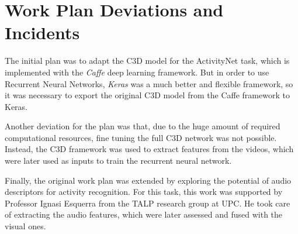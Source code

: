 

\section{Work Plan Deviations and Incidents}
\label{section:work_plan_deviations}

The initial plan was to adapt the C3D\cite{tran2014learning} model for the ActivityNet task, which is implemented with the  \textit{Caffe} deep learning framework. But in order to use Recurrent Neural Networks, \textit{Keras} was a much better and flexible framework, so it was necessary to export the original C3D model from the Caffe framework to Keras.

Another deviation for the plan was that, due to the huge amount of required computational resources, fine tuning the full C3D network was not possible. Instead, the C3D framework was used to extract features from the videos, which were later used as inputs to train the recurrent neural network.

Finally, the original work plan was extended by exploring the potential of audio descriptors for activity recognition. For this task, this work was supported by Professor Ignasi Esquerra from the TALP research group at UPC. He took care of extracting the audio features, which were later assessed and fused with the visual ones.
